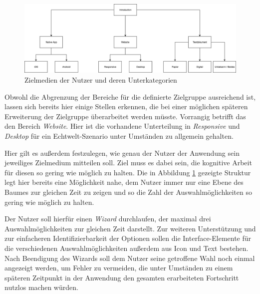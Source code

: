 \begin{figure}[h]
    \centering
    \includegraphics[width=1\textwidth]{images/ablauf_intro.png}
    \caption{Zielmedien der Nutzer und deren Unterkategorien}
    \label{fig:intro}
\end{figure}

Obwohl die Abgrenzung der Bereiche für die definierte Zielgruppe ausreichend ist, lassen sich bereits hier einige Stellen erkennen, die bei einer möglichen späteren Erweiterung der Zielgruppe überarbeitet werden müsste. Vorrangig betrifft das den Bereich \textit{Website}. Hier ist die vorhandene Unterteilung in \textit{Responsive} und \textit{Desktop} für ein Echtwelt-Szenario unter Umständen zu allgemein gehalten.

Hier gilt es außerdem festzulegen, wie genau der Nutzer der Anwendung sein jeweiliges Zielmedium mitteilen soll. Ziel muss es dabei sein, die kognitive Arbeit\footnotemark{} für diesen so gering wie möglich zu halten. Die in Abbildung \ref{fig:intro} gezeigte Struktur legt hier bereits eine Möglichkeit nahe, dem Nutzer immer nur eine Ebene des Baumes zur gleichen Zeit zu zeigen und so die Zahl der Auswahlmöglichkeiten so gering wie möglich zu halten.\\


Der Nutzer soll hierfür einen \textit{Wizard}\footnotemark{} durchlaufen, der maximal drei Auswahlmöglichkeiten zur gleichen Zeit darstellt. Zur weiteren Unterstützung und zur einfacheren Identifizierbarkeit der Optionen sollen die Interface-Elemente für die verschiedenen Auswahlmöglichkeiten außerdem aus Icon und Text bestehen.
Nach Beendigung des Wizards soll dem Nutzer seine getroffene Wahl noch einmal angezeigt werden, um Fehler zu vermeiden, die unter Umständen zu einem späteren Zeitpunkt in der Anwendung den gesamten erarbeiteten Fortschritt nutzlos machen würden.

